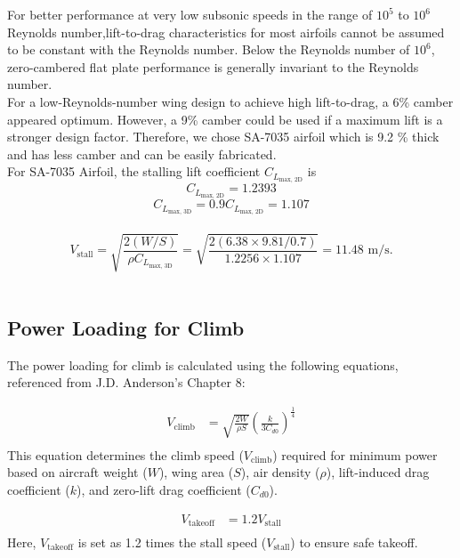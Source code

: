 \documentclass[12 pt]{article}
\begin{document}
For better performance at very low subsonic speeds in the range of ${10^5}$ to ${10^6}$ Reynolds number,lift-to-drag characteristics for most airfoils cannot be assumed to be constant with the Reynolds number. Below the Reynolds number of ${10^6}$, zero-cambered flat plate performance is generally invariant to the Reynolds number. \\

For a low-Reynolds-number wing design to achieve high lift-to-drag, a 6\% camber appeared optimum. However, a 9\% camber could be used if a maximum lift is a stronger design factor. Therefore, we chose SA-7035 airfoil which is 9.2 \% thick and has less camber and can be easily fabricated.\\

For SA-7035 Airfoil, the stalling lift coefficient $C_{L_{\text{max, 2D}}}$ is 
$$C_{L_{\text{max, 2D}}} = 1.2393 $$
$$C_{L_{\text{max, 3D}}} = 0.9 C_{L_{\text{max, 2D}}} = 1.107$$\\
\begin{equation} 
V_{\text{stall}} = \sqrt{\frac{2(W/S)}{\rho C_{L_{\text{max, 3D}}}}} = \sqrt{\frac{2(6.38 \times 9.81 / 0.7)}{1.2256 \times 1.107}} = 11.48 \text{ m/s}. 
\tag{3.11}
\end{equation}
\\ 


\subsection{{Power Loading for Climb}}

The power loading for climb is calculated using the following equations, referenced from J.D. Anderson's Chapter 8:

\begin{align*}
V_{\text{climb}} &= \sqrt{\frac{2W}{\rho S}} \left(\frac{k}{3C_{d0}}\right)^{\frac{1}{4}} \tag{3.12} \\
\end{align*}
This equation determines the climb speed ($V_{\text{climb}}$) required for minimum power based on aircraft weight ($W$), wing area ($S$), air density ($\rho$), lift-induced drag coefficient ($k$), and zero-lift drag coefficient ($C_{d0}$).

\begin{align*}
V_{\text{takeoff}} &= 1.2 V_{\text{stall}} \tag{3.13} \\
\end{align*}
Here, $V_{\text{takeoff}}$ is set as 1.2 times the stall speed ($V_{\text{stall}}$) to ensure safe takeoff.
\end{document}
